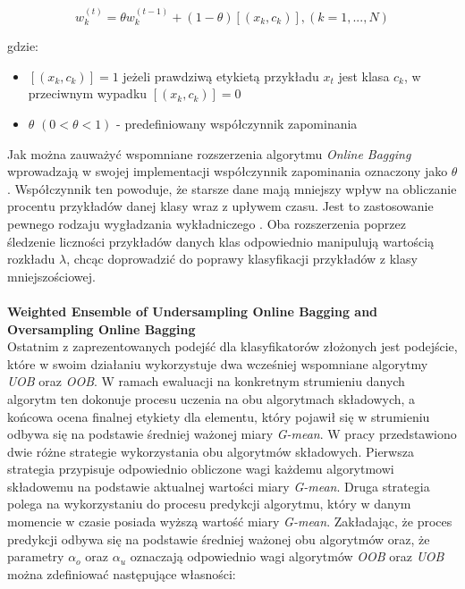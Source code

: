\begin{equation}
    w^{(t)}_k = \theta w^{(t-1)}_k + (1 - \theta)[(x_k, c_k)], (k = 1, ..., N)
\end{equation}

\noindent gdzie:

\begin{itemize}
    \item $[(x_k, c_k)] = 1$ jeżeli prawdziwą etykietą przykładu $x_t$ jest klasa $c_k$, w przeciwnym wypadku $[(x_k, c_k)] = 0$
    \item $\theta$ $(0 < \theta < 1)$ - predefiniowany współczynnik zapominania
\end{itemize}

\noindent Jak można zauważyć wspomniane rozszerzenia algorytmu \textit{Online Bagging} wprowadzają w swojej implementacji współczynnik zapominania oznaczony jako $\theta$. Współczynnik ten powoduje, że starsze dane mają mniejszy wpływ na obliczanie procentu przykładów danej klasy wraz z upływem czasu. Jest to zastosowanie pewnego rodzaju wygładzania wykładniczego \cite{Article:OBSecond}. Oba rozszerzenia poprzez śledzenie liczności przykładów danych klas odpowiednio manipulują wartością rozkładu $\lambda$, chcąc doprowadzić do poprawy klasyfikacji przykładów z klasy mniejszościowej.\\\\
\textbf{Weighted Ensemble of Undersampling Online Bagging and Oversampling Online Bagging}\\

\noindent Ostatnim z zaprezentowanych podejść dla klasyfikatorów złożonych jest podejście, które w swoim działaniu wykorzystuje dwa wcześniej wspomniane algorytmy \textit{UOB} oraz \textit{OOB}. W ramach ewaluacji na konkretnym strumieniu danych algorytm ten dokonuje procesu uczenia na obu algorytmach składowych, a końcowa ocena finalnej etykiety dla elementu, który pojawił się w strumieniu odbywa się na podstawie średniej ważonej miary \textit{G-mean}. W pracy \cite{Article:OBSecond} przedstawiono dwie różne strategie wykorzystania obu algorytmów składowych. Pierwsza strategia przypisuje odpowiednio obliczone wagi każdemu algorytmowi składowemu na podstawie aktualnej wartości miary \textit{G-mean}. Druga strategia polega na wykorzystaniu do procesu predykcji algorytmu, który w danym momencie w czasie posiada wyższą wartość miary \textit{G-mean}. Zakładając, że proces predykcji odbywa się na podstawie średniej ważonej obu algorytmów oraz, że parametry $\alpha_o$ oraz $\alpha_u$ oznaczają odpowiednio wagi algorytmów \textit{OOB} oraz \textit{UOB} można zdefiniować następujące własności:

